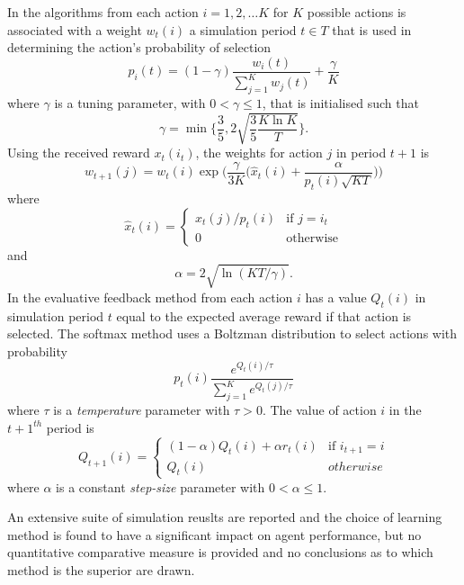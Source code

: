 In the algorithms from \cite{auer:03} each action $i = 1,2,\dotsc K$ for $K$
possible actions is associated with a weight $w_t(i)$ a simulation period $t
\in T$ that is used in determining the action's probability of selection
\begin{equation}
p_i(t) = (1 - \gamma) \frac{w_i(t)}{\sum_{j=1}^K w_j(t)} + \frac{\gamma}{K}
\end{equation}
where $\gamma$ is a tuning parameter, with $0 < \gamma \leq 1$, that is
initialised such that
\begin{equation}
\gamma = \min \Biggl\lbrace \frac{3}{5}, 2\sqrt{\frac{3}{5} \frac{K\ln K}{T}}
\Biggr\rbrace .
\end{equation}
Using the received reward $x_t(i_t)$, the weights for action $j$ in period
$t+1$ is
\begin{equation}
w_{t+1}(j) = w_t(i) \exp \biggl(\frac{\gamma}{3K} \biggl(\hat{x}_t(i) +
\frac{\alpha}{p_t(i)\sqrt{KT}}\biggr)\biggr)
\end{equation}
where
\begin{equation}
\hat{x}_t(i) =
\begin{cases}
x_t(j)/p_t(i)& \text{if $j=i_t$}\\
0& \text{otherwise}
\end{cases}\end{equation}
and
\begin{equation}
\alpha = 2\sqrt{\ln(KT/\gamma)}.
\end{equation}
In the evaluative feedback method from \cite[\S2]{suttonbarto:1998} each action
$i$ has a value $Q_t(i)$ in simulation period $t$ equal to the expected average
reward if that action is selected.  The softmax method uses a Boltzman
distribution to select actions with probability
\begin{equation}
p_t(i) \frac{e^{Q_t(i)/\tau}}{\sum_{j=1}^K e^{Q_t(j)/\tau}}
\end{equation}
where $\tau$ is a \textit{temperature} parameter with $\tau > 0$.  The value of
action $i$ in the $t+1^{th}$ period is
\begin{equation}
Q_{t+1}(i) = \begin{cases}
(1-\alpha)Q_t(i) + \alpha r_t(i) & \text{if $i_{t+1}=i$}\\
Q_t(i) & otherwise
\end{cases}
\end{equation}
where $\alpha$ is a constant \textit{step-size} parameter with $0 < \alpha
\leq 1$.

An extensive suite of simulation reuslts are reported and the choice of
learning method is found to have a significant impact on agent performance, but
no quantitative comparative measure is provided and no conclusions as to which
method is the superior are drawn.

